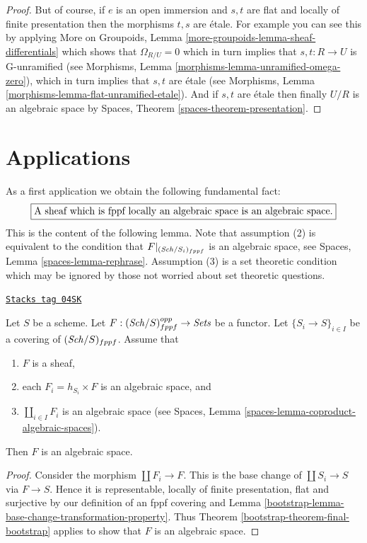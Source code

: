 \begin{proof}
\medskip\noindent
But of course, if $e$ is an open immersion and
$s, t$ are flat and locally of finite presentation
then the morphisms $t, s$ are \'etale.
For example you can see this by applying
More on Groupoids, Lemma \ref{more-groupoids-lemma-sheaf-differentials}
which shows that $\Omega_{R/U} = 0$ which in turn implies
that $s, t : R \to U$ is G-unramified (see
Morphisms, Lemma \ref{morphisms-lemma-unramified-omega-zero}),
which in turn implies that $s, t$ are \'etale (see
Morphisms, Lemma \ref{morphisms-lemma-flat-unramified-etale}).
And if $s, t$ are \'etale then finally $U/R$ is an algebraic
space by
Spaces, Theorem \ref{spaces-theorem-presentation}.
\end{proof}

\section{Applications}
\label{bootstrap-section-applications}
As a first application we obtain the following fundamental fact:
$$
\fbox{A sheaf which is fppf locally an algebraic space is an algebraic space.}
$$
This is the content of the following lemma.
Note that assumption (2) is equivalent to the condition that
$F|_{(\mathit{Sch}/S_i)_{fppf}}$ is an algebraic space, see
Spaces, Lemma \ref{spaces-lemma-rephrase}.
Assumption (3) is a set theoretic condition which may be ignored
by those not worried about set theoretic questions.

\begin{lemma}
\label{bootstrap-lemma-locally-algebraic-space}
\href{https://stacks.math.columbia.edu/tag/04SK}{\texttt{Stacks tag 04SK}}


Let $S$ be a scheme.
Let $F : (\mathit{Sch}/S)_{fppf}^{opp} \to \textit{Sets}$ be a functor.
Let $\{S_i \to S\}_{i \in I}$ be a covering of $(\mathit{Sch}/S)_{fppf}$.
Assume that
\begin{enumerate}
\item $F$ is a sheaf,
\item each $F_i = h_{S_i} \times F$ is an algebraic space, and
\item $\coprod_{i \in I} F_i$ is an algebraic space (see
Spaces, Lemma \ref{spaces-lemma-coproduct-algebraic-spaces}).
\end{enumerate}
Then $F$ is an algebraic space.
\end{lemma}

\begin{proof}

Consider the morphism $\coprod F_i \to F$. This is the base change
of $\coprod S_i \to S$ via $F \to S$. Hence it is representable,
locally of finite presentation, flat and surjective by our definition
of an fppf covering and
Lemma \ref{bootstrap-lemma-base-change-transformation-property}.
Thus
Theorem \ref{bootstrap-theorem-final-bootstrap}
applies to show that $F$ is an algebraic space.
\end{proof}

